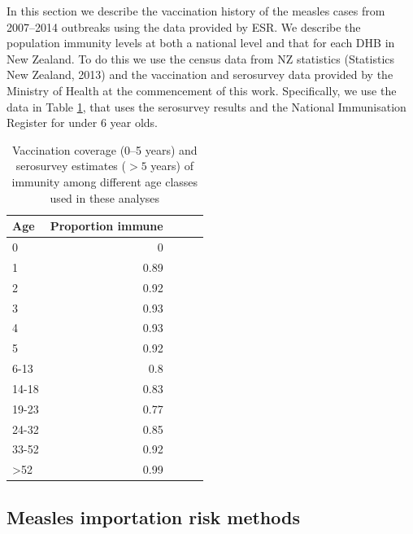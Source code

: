 \documentclass{article}
\begin{document}
\begin{itemize}
In this section we describe the vaccination history of the measles cases from 2007--2014 outbreaks using the data provided by ESR. We describe the population immunity levels at both a national level and that for each DHB in New Zealand. To do this we use the census data from NZ statistics (Statistics New Zealand, 2013) and the vaccination and serosurvey data provided by the Ministry of Health at the commencement of this work. Specifically, we use the data in Table \ref{table:sero}, that uses the serosurvey results and the National Immunisation Register for under 6 year olds.

\begin{table}[htdp]
\begin{center}
\begin{tabular}{lrrrr}
\hline
Age &  Proportion immune\\
\hline
0  & 0\\
1  & 0.89\\
2	& 0.92\\
3	& 0.93\\
4	& 0.93\\
5	& 0.92\\
6-13	& 0.8\\
14-18	& 0.83\\
19-23	& 0.77\\
24-32	& 0.85\\
33-52	& 0.92\\
>52	& 0.99\\
\hline
\end{tabular}
\end{center}
\caption{Vaccination coverage (0--5 years) and serosurvey estimates ($>5$ years) of immunity among different age classes used in these analyses}
\label{table:sero}
\end{table}%

\subsection{Measles importation risk methods}


\end{itemize}
\end{document}
